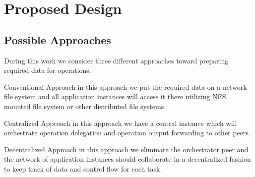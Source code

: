 \chapter{Proposed Design}
\label{cha:proposal}




\section{Possible Approaches}
During this work we consider three different approaches toward preparing required data for operations.
\begin{description}
\item{Conventional Approach} in this approach we put the required data on a network file system and all
application instances will access it there utilizing NFS mounted file system or other distributed file systems.
\item{Centralized Approach} in this approach we have a central instance which will orchestrate operation
delegation and operation output forwarding to other peers.
\item{Decentralized Approach} in this approach we eliminate the orchestrator peer and the network of
application instances should collaborate in a decentralized fashion to keep track of data and control flow for each
task.
\end{description}

